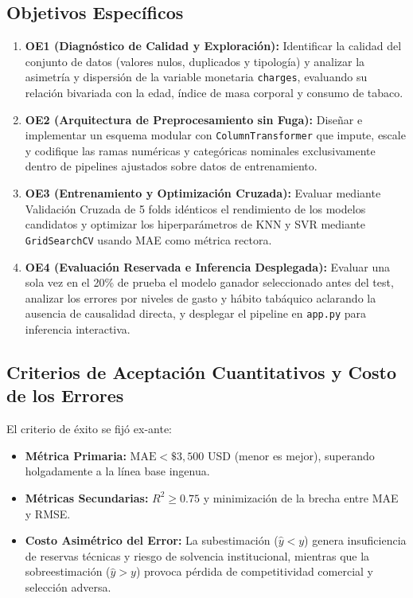 \documentclass[11pt,a4paper]{article}
\begin{document}
\subsection{Objetivos Específicos}
\begin{enumerate}[leftmargin=*]
    \item \textbf{OE1 (Diagnóstico de Calidad y Exploración):} Identificar la calidad del conjunto de datos (valores nulos, duplicados y tipología) y analizar la asimetría y dispersión de la variable monetaria \texttt{charges}, evaluando su relación bivariada con la edad, índice de masa corporal y consumo de tabaco.
    \item \textbf{OE2 (Arquitectura de Preprocesamiento sin Fuga):} Diseñar e implementar un esquema modular con \texttt{ColumnTransformer} que impute, escale y codifique las ramas numéricas y categóricas nominales exclusivamente dentro de pipelines ajustados sobre datos de entrenamiento.
    \item \textbf{OE3 (Entrenamiento y Optimización Cruzada):} Evaluar mediante Validación Cruzada de 5 folds idénticos el rendimiento de los modelos candidatos y optimizar los hiperparámetros de KNN y SVR mediante \texttt{GridSearchCV} usando MAE como métrica rectora.
    \item \textbf{OE4 (Evaluación Reservada e Inferencia Desplegada):} Evaluar una sola vez en el 20\% de prueba el modelo ganador seleccionado antes del test, analizar los errores por niveles de gasto y hábito tabáquico aclarando la ausencia de causalidad directa, y desplegar el pipeline en \texttt{app.py} para inferencia interactiva.
\end{enumerate}

\subsection{Criterios de Aceptación Cuantitativos y Costo de los Errores}
El criterio de éxito se fijó ex-ante:
\begin{itemize}[leftmargin=*]
    \item \textbf{Métrica Primaria:} $\text{MAE} < \$3,500$ USD (menor es mejor), superando holgadamente a la línea base ingenua.
    \item \textbf{Métricas Secundarias:} $R^2 \ge 0.75$ y minimización de la brecha entre MAE y RMSE.
    \item \textbf{Costo Asimétrico del Error:} La subestimación ($\hat{y} < y$) genera insuficiencia de reservas técnicas y riesgo de solvencia institucional, mientras que la sobreestimación ($\hat{y} > y$) provoca pérdida de competitividad comercial y selección adversa.
\end{itemize}
\end{document}
